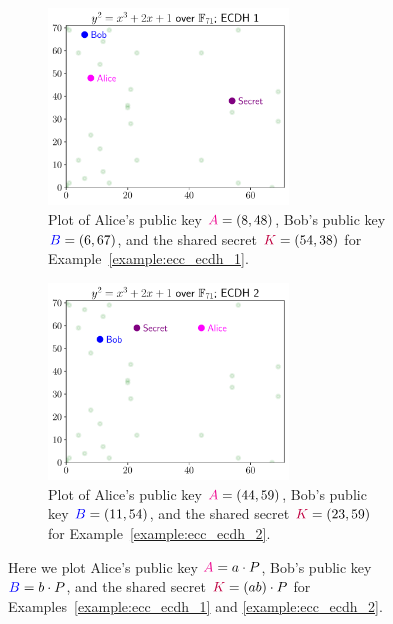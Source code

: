 \begin{figure}[p]
\centering
    \begin{subfigure}[t]{\textwidth}
        \centering
    \includegraphics[width=0.70\textwidth]{plots/ec_finite/ec_finite_F_71_2_1_ecdh_1.pdf}
    \caption{Plot of Alice's public key ${\color{magenta}{A}} = \left( 8,48 \right)$,
    Bob's public key ${\color{blue}{B}} = \left( 6,67 \right)$,
    and the \gls{shared secret} ${\color{purple}{K}} = \left( 54,38 \right)$
    for Example~\ref{example:ecc_ecdh_1}.}
    \label{fig:ec_finite_plots_ecdh_1}
    \end{subfigure}

    \begin{subfigure}[t]{\textwidth}
        \centering
    \includegraphics[width=0.70\textwidth]{plots/ec_finite/ec_finite_F_71_2_1_ecdh_2.pdf}
    \caption{Plot of Alice's public key ${\color{magenta}{A}} = \left( 44,59 \right)$,
    Bob's public key ${\color{blue}{B}} = \left( 11,54 \right)$,
    and the \gls{shared secret} ${\color{purple}{K}} = \left( 23,59 \right)$
    for Example~\ref{example:ecc_ecdh_2}.}
    \label{fig:ec_finite_plots_ecdh_2}
    \end{subfigure}

\caption[Plots of public keys and shared secrets for ECDH]{Here
    we plot Alice's public key ${\color{magenta}{A}} = a\cdot P$,
    Bob's public key ${\color{blue}{B}} = b\cdot P$,
    and the \gls{shared secret} ${\color{purple}{K}} = (ab)\cdot P$
    for Examples~\ref{example:ecc_ecdh_1} and \ref{example:ecc_ecdh_2}.
    }
\label{fig:ec_finite_plots_ecdh}
\end{figure}
